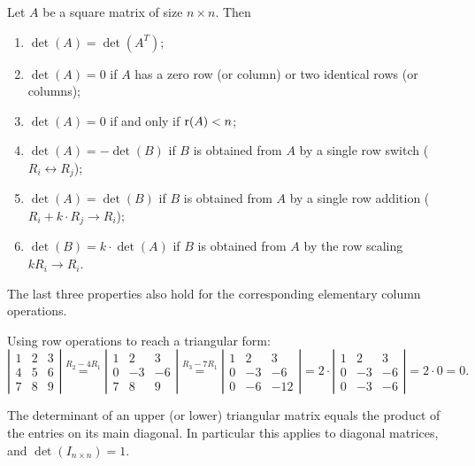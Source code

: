 \begin{fact}
Let $A$ be a square matrix of size $n\times n$. Then
\begin{enumerate}
\item $\det(A) = \det(A^T)$;
\item $\det(A) = 0$ if $A$ has a zero row (or column) or two identical rows (or columns);
\item $\det(A) = 0$ if and only if $\operatorname{r}(A)<n$;
\item $\det(A) = -\det(B)$ if $B$ is obtained from $A$ by a single row switch ($R_i\leftrightarrow R_j$);
\item $\det(A) = \det(B)$ if $B$ is obtained from $A$ by a single row addition
($R_i+k\cdot R_j\rightarrow R_i$);
\item $\det(B) = k\cdot \det(A)$ if $B$ is obtained from $A$ by the row scaling $kR_i\rightarrow R_i$.
\end{enumerate}
The last three properties also hold for the corresponding elementary column operations.
\end{fact}

\begin{example}
Using row operations to reach a triangular form:
\[
\left | \begin{array}{ccc}
1 & 2 & 3\\ 4 & 5 & 6\\ 7 & 8 & 9
\end{array} \right |
\overset{R_2-4 R_1}{=}
\left | \begin{array}{ccc}
1 & 2 & 3\\ 0 & -3 & -6\\ 7 & 8 & 9
\end{array} \right |
\overset{R_3-7 R_1}{=}
\left | \begin{array}{ccc}
1 & 2 & 3\\ 0 & -3 & -6\\ 0 & -6 & -12
\end{array} \right |
= 2\cdot \left | \begin{array}{ccc}
1 & 2 & 3\\ 0 & -3 & -6\\ 0 & -3 & -6
\end{array} \right | = 2\cdot 0 = 0.
\]
\end{example}

\begin{fact}
The determinant of an upper (or lower) triangular matrix equals the product of the entries on its main
diagonal. In particular this applies to diagonal matrices, and $\det( I_{n\times n} ) = 1$.
\end{fact}

